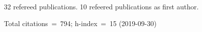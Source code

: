 32 refereed publications. 10 refeered publications as first author.

Total citations~=~794; h-index~=~15 (2019-09-30)